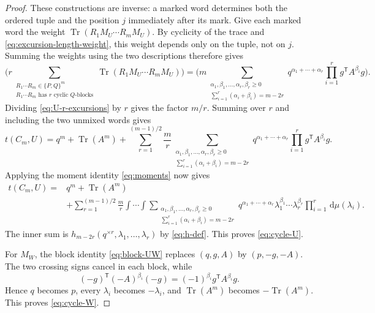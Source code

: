 \documentclass[11pt]{article}
\numberwithin{equation}{section}
\newcommand{\Tr}{\operatorname{Tr}}
\newcommand{\dd}{\,\mathrm d}
\newcommand{\tC}[2]{t(C_{#1},#2)}
\newcommand{\rep}[2]{#1^{\times #2}}
\begin{document}
\begin{proof}
  These constructions are inverse: a marked word determines both the
  ordered tuple and the position $j$ immediately after its mark.
  Give each marked word the weight $\Tr(R_1M_U\cdots R_mM_U)$.
  By cyclicity of the trace and \eqref{eq:excursion-length-weight}, this
  weight depends only on the tuple, not on $j$.
  Summing the weights using the two descriptions therefore gives
  \begin{equation}\label{eq:U-r-excursions}
      \Bigg(
        r\!\!\!\!
        \sum_{\substack{R_1\cdots R_m\in\{P,Q\}^m\\
                       R_1\cdots R_m\text{ has }r\text{ cyclic $Q$-blocks}}}
        \Tr(R_1M_U\cdots R_mM_U)\Bigg)
      =
      \Bigg(
        m \!\!\!\!
        \sum_{\substack{\alpha_1,\beta_1,\ldots,
                          \alpha_r,\beta_r\ge0\\
                          \sum_{i=1}^r(\alpha_i+\beta_i)=m-2r}}
        q^{\alpha_1+\cdots+\alpha_r}
        \prod_{i=1}^rg^{\mathsf T}A^{\beta_i}g\Bigg).
  \end{equation}
  Dividing \eqref{eq:U-r-excursions} by $r$ gives the factor $m/r$.
  Summing over $r$ and including the two unmixed words gives
  \[
    \tC mU=q^m+\Tr(A^m)
    +\sum_{r=1}^{(m-1)/2}\frac mr
      \sum_{\substack{\alpha_1,\beta_1,\ldots,
                        \alpha_r,\beta_r\ge0\\
                        \sum_{i=1}^r(\alpha_i+\beta_i)=m-2r}}
      q^{\alpha_1+\cdots+\alpha_r}
      \prod_{i=1}^rg^{\mathsf T}A^{\beta_i}g.
  \]
  Applying the moment identity \eqref{eq:moments} now gives
  \[
    \begin{aligned}
      \tC mU={}&q^m+\Tr(A^m)\\
      &+\sum_{r=1}^{(m-1)/2}\frac mr
      \int\!\cdots\!\int
      \sum_{\substack{\alpha_1,\beta_1,\ldots,
                        \alpha_r,\beta_r\ge0\\
                        \sum_{i=1}^r(\alpha_i+\beta_i)=m-2r}}
      q^{\alpha_1+\cdots+\alpha_r}
      \lambda_1^{\beta_1}\cdots\lambda_r^{\beta_r}
      \prod_{i=1}^r\dd\mu(\lambda_i).
    \end{aligned}
  \]
  The inner sum is
  $h_{m-2r}(\rep qr,\lambda_1,\ldots,\lambda_r)$ by
  \eqref{eq:h-def}.  This proves \eqref{eq:cycle-U}.

  For $M_W$, the block identity \eqref{eq:block-UW} replaces
  $(q,g,A)$ by $(p,-g,-A)$.  The two crossing signs cancel in each block,
  while
  \[
    (-g)^{\mathsf T}(-A)^{\beta_i}(-g)
    =(-1)^{\beta_i}g^{\mathsf T}A^{\beta_i}g.
  \]
  Hence $q$ becomes $p$, every $\lambda_i$ becomes $-\lambda_i$, and
  $\Tr(A^m)$ becomes $-\Tr(A^m)$.  This proves \eqref{eq:cycle-W}.
\end{proof}
\end{document}
